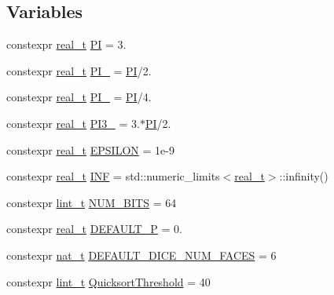 \subsection*{Variables}
\begin{DoxyCompactItemize}
\item 
constexpr \hyperlink{namespace_designar_aca2c32af26808dbec1f3a3071fad25ce}{real\+\_\+t} \hyperlink{namespace_designar_a2085e876f193b2212cd11dd2770b2d0b}{PI} = 3.
\item 
constexpr \hyperlink{namespace_designar_aca2c32af26808dbec1f3a3071fad25ce}{real\+\_\+t} \hyperlink{namespace_designar_a06ae46c26bfae21d3284882e3f5b9f60}{P\+I\+\_} = \hyperlink{namespace_designar_a2085e876f193b2212cd11dd2770b2d0b}{PI}/2.
\item 
constexpr \hyperlink{namespace_designar_aca2c32af26808dbec1f3a3071fad25ce}{real\+\_\+t} \hyperlink{namespace_designar_a5d073eb77d1d0886610584ee1441d8de}{P\+I\+\_} = \hyperlink{namespace_designar_a2085e876f193b2212cd11dd2770b2d0b}{PI}/4.
\item 
constexpr \hyperlink{namespace_designar_aca2c32af26808dbec1f3a3071fad25ce}{real\+\_\+t} \hyperlink{namespace_designar_acdac587da03b3c280ba8c4b2ef3f6983}{P\+I3\+\_} = 3.$\ast$\hyperlink{namespace_designar_a2085e876f193b2212cd11dd2770b2d0b}{PI}/2.
\item 
constexpr \hyperlink{namespace_designar_aca2c32af26808dbec1f3a3071fad25ce}{real\+\_\+t} \hyperlink{namespace_designar_a00f1421c35b33865c9c955435b35e514}{E\+P\+S\+I\+L\+ON} = 1e-\/9
\item 
constexpr \hyperlink{namespace_designar_aca2c32af26808dbec1f3a3071fad25ce}{real\+\_\+t} \hyperlink{namespace_designar_a74903000a6e8d8117bb29540ef1d07ae}{I\+NF} = std\+::numeric\+\_\+limits$<$\hyperlink{namespace_designar_aca2c32af26808dbec1f3a3071fad25ce}{real\+\_\+t}$>$\+::infinity()
\item 
constexpr \hyperlink{namespace_designar_a9d113d66a39e82b73727c72cd3a52f73}{lint\+\_\+t} \hyperlink{namespace_designar_abb77bd8c0a61847409c6dcb779b66974}{N\+U\+M\+\_\+\+B\+I\+TS} = 64
\item 
constexpr \hyperlink{namespace_designar_aca2c32af26808dbec1f3a3071fad25ce}{real\+\_\+t} \hyperlink{namespace_designar_a2b9b8e0588e8d75548e74bd590e6f9e5}{D\+E\+F\+A\+U\+L\+T\+\_\+P} = 0.
\item 
constexpr \hyperlink{namespace_designar_aa72662848b9f4815e7bf31a7cf3e33d1}{nat\+\_\+t} \hyperlink{namespace_designar_af614c8a444ce943532075892ad401662}{D\+E\+F\+A\+U\+L\+T\+\_\+\+D\+I\+C\+E\+\_\+\+N\+U\+M\+\_\+\+F\+A\+C\+ES} = 6
\item 
constexpr \hyperlink{namespace_designar_a9d113d66a39e82b73727c72cd3a52f73}{lint\+\_\+t} \hyperlink{namespace_designar_a62c201985e06bb7419a888d5d2b7bde8}{Quicksort\+Threshold} = 40
\end{DoxyCompactItemize}


